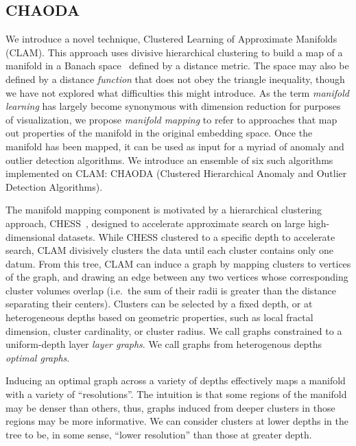 \subsection{CHAODA}
\label{subsec:introduction:chaoda}

We introduce a novel technique, Clustered Learning of Approximate Manifolds (CLAM).
This approach uses divisive hierarchical clustering to build a map of a manifold in a Banach space~\cite{banach1929fonctionnelles} defined by a distance metric.
The space may also be defined by a distance \textit{function} that does not obey the triangle inequality, though we have not explored what difficulties this might introduce.
As the term \emph{manifold learning} has largely become synonymous with dimension reduction for purposes of visualization, we propose \emph{manifold mapping} to refer to approaches that map out properties of the manifold in the original embedding space.
Once the manifold has been mapped, it can be used as input for a myriad of anomaly and outlier detection algorithms.
We introduce an ensemble of six such algorithms implemented on CLAM: CHAODA (Clustered Hierarchical Anomaly and Outlier Detection Algorithms).

The manifold mapping component is motivated by a hierarchical clustering approach, CHESS~\cite{ishaq2019clustered}, designed to accelerate approximate search on large high-dimensional datasets.
While CHESS clustered to a specific depth to accelerate search, CLAM
divisively clusters the data until each cluster contains only one datum.
From this tree, CLAM can induce a graph by mapping clusters to vertices of the graph, and drawing an edge between any two vertices whose corresponding cluster volumes overlap (i.e.\ the sum of their radii is greater than the distance separating their centers).
Clusters can be selected by a fixed depth, or at heterogeneous depths based on geometric properties, such as local fractal dimension, cluster cardinality, or cluster radius.
We call graphs constrained to a uniform-depth layer \textit{layer graphs}.
We call graphs from heterogenous depths \textit{optimal graphs}.

Inducing an optimal graph across a variety of depths effectively maps a manifold with a variety of ``resolutions''.
The intuition is that some regions of the manifold may be denser than others, thus, graphs induced from deeper clusters in those regions may be more informative.
We can consider clusters at lower depths in the tree to be, in some sense, ``lower resolution'' than those at greater depth.

